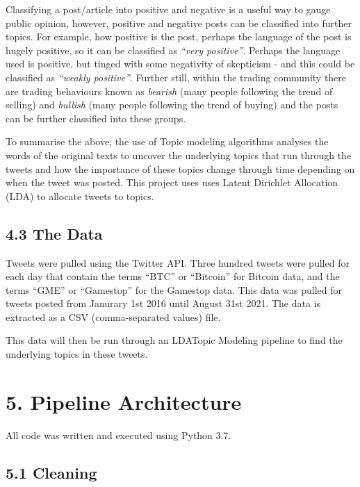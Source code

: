 \documentclass[
]{article}
\begin{document}
Classifying a post/article into positive and negative is a useful way to
gauge public opinion, however, positive and negative posts can be
classified into further topics. For example, how positive is the post,
perhaps the language of the post is hugely positive, so it can be
classified as \emph{``very positive''}. Perhaps the language used is
positive, but tinged with some negativity of skepticism - and this could
be classified as \emph{``weakly positive''}. Further still, within the
trading community there are trading behaviours known as \emph{bearish}
(many people following the trend of selling) and \emph{bullish} (many
people following the trend of buying) and the posts can be further
classified into these groups.

To summarise the above, the use of Topic modeling algorithms analyses
the words of the original texts to uncover the underlying topics that
run through the tweets and how the importance of these topics change
through time depending on when the tweet was posted. This project uses
uses Latent Dirichlet Allocation (LDA) to allocate tweets to topics.

\hypertarget{the-data}{%
\subsection{4.3 The Data}\label{the-data}}

Tweets were pulled using the Twitter API. Three hundred tweets were
pulled for each day that contain the terms ``BTC'' or ``Bitcoin'' for
Bitcoin data, and the terms ``GME'' or ``Gamestop'' for the Gamestop
data. This data was pulled for tweets posted from Janurary 1st 2016
until August 31st 2021. The data is extracted as a CSV (comma-separated
values) file.

This data will then be run through an LDATopic Modeling pipeline to find
the underlying topics in these tweets.

\hypertarget{pipeline-architecture}{%
\section{5. Pipeline Architecture}\label{pipeline-architecture}}

All code was written and executed using Python 3.7.

\hypertarget{cleaning}{%
\subsection{5.1 Cleaning}\label{cleaning}}
\end{document}
